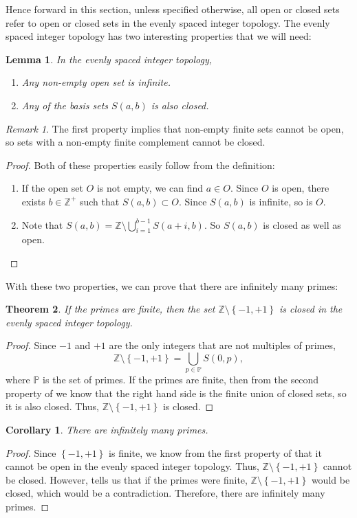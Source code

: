 \documentclass[a4paper]{article}
\newtheorem{theorem}{Theorem}[section]
\newtheorem{corollary}{Corollary}[theorem]
\newtheorem{lemma}[theorem]{Lemma}
\theoremstyle{definition}
\theoremstyle{remark}
\newtheorem*{remark}{Remark}
\begin{document}
Hence forward in this section, unless specified otherwise, all open or closed sets refer to open or closed sets in the evenly spaced integer topology.
The evenly spaced integer topology has two interesting properties that we will need:
\begin{lemma}
  In the evenly spaced integer topology,
  \begin{enumerate}
    \item Any non-empty open set is infinite.
    \item Any of the basis sets $S(a,b)$ is also closed.
  \end{enumerate}
  \label{lem:2prop}
\end{lemma}
\begin{remark}
  The first property implies that non-empty finite sets cannot be open, so sets with a non-empty finite complement cannot be closed.
  \label{rem:2prop}
\end{remark}
\begin{proof}
  Both of these properties easily follow from the definition:
  \begin{enumerate}
    \item If the open set $O$ is not empty, we can find $a\in O$. Since $O$ is open, there exists $b\in\mathbb{Z}^+$ such that $S(a,b)\subset O$. Since $S(a,b)$ is infinite, so is $O$.
    \item Note that $\displaystyle S(a,b)=\mathbb{Z}\setminus \bigcup\limits_{i=1}^{b-1}S(a+i,b)$. So $S(a,b)$ is closed as well as open.
  \end{enumerate}
\end{proof}
With these two properties, we can prove that there are infinitely many primes:
\begin{theorem}
  If the primes are finite, then the set $\mathbb{Z}\setminus\left\{ -1,+1 \right\}$ is closed in the evenly spaced integer topology.
  \label{thm:topPrimes}
\end{theorem}
\begin{proof}
  Since $-1$ and $+1$ are the only integers that are not multiples of primes,
  \[
  \mathbb{Z}\setminus\left\{ -1,+1 \right\}=\bigcup\limits_{p\in\mathbb{P}}S(0,p)
  ,
  \]
  where $\mathbb{P}$ is the set of primes.
  If the primes are finite, then from the second property of  we know that the right hand side is the finite union of closed sets, so it is also closed. Thus, $\mathbb{Z}\setminus\left\{ -1,+1 \right\}$ is closed. 
\end{proof}
\begin{corollary}
  There are infinitely many primes.
  \label{cor:topPrimes}
\end{corollary}
\begin{proof}
  Since $\left\{ -1,+1 \right\}$ is finite, we know from the first property of  that it cannot be open in the evenly spaced integer topology. Thus, $\mathbb{Z}\setminus\left\{ -1,+1 \right\}$ cannot be closed. However,  tells us that if the primes were finite,  $\mathbb{Z}\setminus\left\{ -1,+1 \right\}$ would be closed, which would be a contradiction. Therefore, there are infinitely many primes.
\end{proof}
\end{document}
